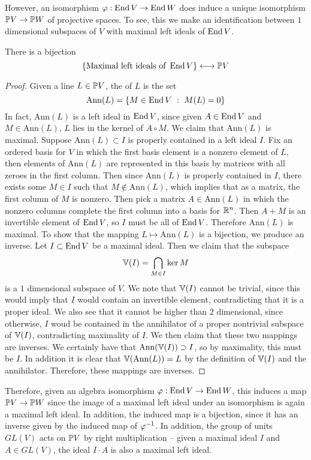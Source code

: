 %
However, an isomorphism $\varphi : \End V \to \End W$ does induce a unique isomorphism
$\P V \to \P W$ of projective spaces. To see, this we make an identification
between $1$ dimensional subspaces of $V$ with maximal left ideals of $\End V$.
%
\begin{prop}
There is a bijection
\[
\set{\text{Maximal left ideals of } \End V} \longleftrightarrow \P V
\]
\end{prop}
%
\begin{proof}
Given a line $L \in \P V$, the  of $L$ is the set
\[
\mathrm{Ann}(L) = \set{M \in \End V ~:~ M(L) = 0}
\]
In fact, $\mathrm{Ann}(L)$
is a left ideal in $\End V$, since given $A \in \End V$ and $M \in \mathrm{Ann}(L)$,
$L$ lies in the kernel of $A \circ M$. We claim that $\mathrm{Ann}(L)$ is maximal.
Suppose $\mathrm{Ann}(L) \subset I$ is properly contained in a left ideal $I$.
Fix an ordered basis for $V$ in which the first basis element is a
nonzero element of $L$, then elements of $\mathrm{Ann}(L)$ are represented in this basis
by matrices with all zeroes in the first column. Then since $\mathrm{Ann}(L)$ is
properly contained in $I$, there exists some $M \in I$ such that
$M \notin \mathrm{Ann}(L)$, which implies that as a matrix, the first column
of $M$ is nonzero. Then pick a matrix $A \in \mathrm{Ann}(L)$ in which
the nonzero columns complete the first column into a basis for $\R^n$. Then
$A + M$ is an invertible element of $\End V$, so $I$ must be all of $\End V$.
Therefore $\mathrm{Ann}(L)$ is maximal. To show that the mapping
$L \mapsto \mathrm{Ann}(L)$ is a bijection, we produce an inverse. Let
$I \subset \End V$ be a maximal ideal. Then we claim that the subspace
\[
\V(I) = \bigcap_{M \in I}\ker M
\]
is a $1$ dimensional subspace of $V$. We note that $\V(I)$ cannot be trivial,
since this would imply that $I$ would contain an invertible element, contradicting
that it is a proper ideal. We also see that it cannot be higher than $2$ dimensional,
since otherwise, $I$ woud be contained in the annihilator of a proper nontrivial
subspace of $\V(I)$, contradicting maximality of $I$. We then claim that
these two mappings are inverses. We certainly have that
$\mathrm{Ann}(\V(I)) \supset I$, so by maximality, this must be $I$. In addition
it is clear that $\V(\mathrm{Ann}(L)) = L$ by the definition of $\V(I)$ and
the annihilator. Therefore, these mappings are inverses.
\end{proof}
%
Therefore, given an algebra isomorphism $\varphi : \End V \to \End W$, this
induces a map $\P V \to \P W$ since the image of a maximal left ideal under an
isomorphism is again a maximal left ideal. In addition, the induced map is a bijection,
since it has an inverse given by the induced map of $\varphi\inv$. In
addition, the group of units $GL(V)$ acts on $\P V$ by right multiplication --
given a maximal ideal $I$ and $A \in GL(V)$, the ideal $I \cdot A$ is also
a maximal left ideal. \\

